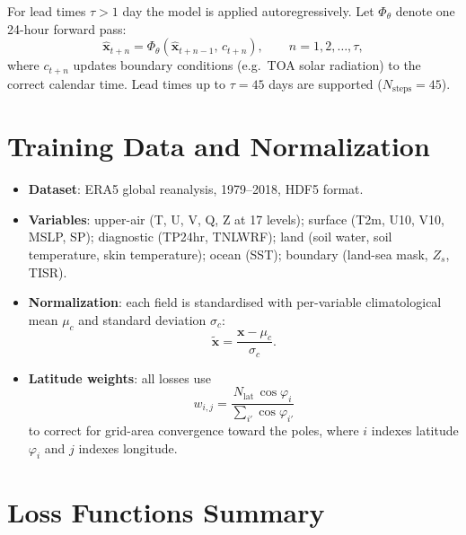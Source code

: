 \documentclass[11pt]{article}
\begin{document}
For lead times $\tau > 1$ day the model is applied autoregressively. Let
$\Phi_\theta$ denote one 24-hour forward pass:
\begin{equation}
  \hat{\mathbf{x}}_{t+n}
  = \Phi_\theta\!\left(\hat{\mathbf{x}}_{t+n-1},\,c_{t+n}\right),
  \qquad n = 1, 2, \ldots, \tau,
\end{equation}
where $c_{t+n}$ updates boundary conditions (e.g.\ TOA solar radiation) to the
correct calendar time. Lead times up to $\tau = 45$ days are supported ($N_{\mathrm{steps}} = 45$).

\section{Training Data and Normalization}

\begin{itemize}
  \item \textbf{Dataset}: ERA5 global reanalysis, 1979--2018, HDF5 format.
  \item \textbf{Variables}: upper-air (T, U, V, Q, Z at 17 levels); surface
        (T2m, U10, V10, MSLP, SP); diagnostic (TP24hr, TNLWRF); land (soil
        water, soil temperature, skin temperature); ocean (SST); boundary
        (land-sea mask, $Z_s$, TISR).
  \item \textbf{Normalization}: each field is standardised with per-variable
        climatological mean $\mu_c$ and standard deviation $\sigma_c$:
        \begin{equation}
          \tilde{\mathbf{x}} = \frac{\mathbf{x} - \mu_c}{\sigma_c}.
        \end{equation}
  \item \textbf{Latitude weights}: all losses use
        \begin{equation}
          w_{i,j}
          = \frac{N_{\mathrm{lat}}\,\cos\varphi_i}
                 {\displaystyle\sum_{i'}\cos\varphi_{i'}}
        \end{equation}
        to correct for grid-area convergence toward the poles, where $i$ indexes
        latitude $\varphi_i$ and $j$ indexes longitude.
\end{itemize}

\section{Loss Functions Summary}
\end{document}
